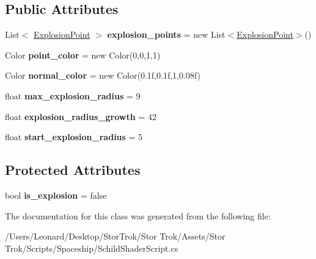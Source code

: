 \subsection*{Public Attributes}
\begin{DoxyCompactItemize}
\item 
\mbox{\label{class_schild_shader_script_ae129f6ef67e8cec9bdabaa4095fae180}} 
List$<$ \hyperlink{struct_explosion_point}{Explosion\+Point} $>$ {\bfseries explosion\+\_\+points} = new List$<$\hyperlink{struct_explosion_point}{Explosion\+Point}$>$()
\item 
\mbox{\label{class_schild_shader_script_aac6712e57dd87fe82912d5d7a8d4f3b4}} 
Color {\bfseries point\+\_\+color} = new Color(0,0,1,1)
\item 
\mbox{\label{class_schild_shader_script_a6a4af906d540b5318ac89cb946b8d099}} 
Color {\bfseries normal\+\_\+color} = new Color(0.\+1f,0.\+1f,1,0.\+08f)
\item 
\mbox{\label{class_schild_shader_script_aab156c5a7256b1a323afc8b369fe5781}} 
float {\bfseries max\+\_\+explosion\+\_\+radius} = 9
\item 
\mbox{\label{class_schild_shader_script_a55cd3a4ab58ea2de7d0fcf2bed4f5d28}} 
float {\bfseries explosion\+\_\+radius\+\_\+growth} = 42
\item 
\mbox{\label{class_schild_shader_script_aeb7b40e3c59b74128faae68115083c61}} 
float {\bfseries start\+\_\+explosion\+\_\+radius} = 5
\end{DoxyCompactItemize}
\subsection*{Protected Attributes}
\begin{DoxyCompactItemize}
\item 
\mbox{\label{class_schild_shader_script_a1b7e209c692fb4fefcd5a052bebb66bc}} 
bool {\bfseries is\+\_\+explosion} = false
\end{DoxyCompactItemize}


The documentation for this class was generated from the following file\+:\begin{DoxyCompactItemize}
\item 
/\+Users/\+Leonard/\+Desktop/\+Stor\+Trok/\+Stor Trok/\+Assets/\+Stor Trok/\+Scripts/\+Spaceship/Schild\+Shader\+Script.\+cs\end{DoxyCompactItemize}
